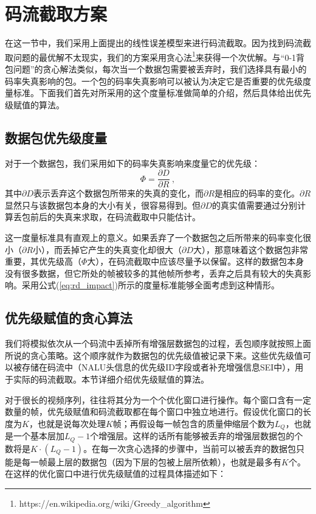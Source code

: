 \section{码流截取方案}
\label{extraction}

在这一节中，我们采用上面提出的线性误差模型来进行码流截取。因为找到码流截取问题的最优解不太现实，我们的方案采用贪心法\footnote{https://en.wikipedia.org/wiki/Greedy\_algorithm}来获得一个次优解。与“0-1背包问题”的贪心解法类似，每次当一个数据包需要被丢弃时，我们选择具有最小的码率失真影响的包。一个包的码率失真影响可以被认为决定它是否重要的优先级度量标准。下面我们首先对所采用的这个度量标准做简单的介绍，然后具体给出优先级赋值的算法。

\subsection{数据包优先级度量}

对于一个数据包，我们采用如下的码率失真影响来度量它的优先级：
\begin{equation}
\label{eq:rd_impact}
\Phi = \dfrac{\partial D}{\partial R} \: ,
\end{equation}
其中$\partial D$表示丢弃这个数据包所带来的失真的变化，而$\partial R$是相应的码率的变化。$\partial R$显然只与该数据包本身的大小有关，很容易得到。但$\partial D$的真实值需要通过分别计算丢包前后的失真来求取，在码流截取中只能估计。

这一度量标准具有直观上的意义。如果丢弃了一个数据包之后所带来的码率变化很小（$\partial R$小），而丢掉它产生的失真变化却很大（$\partial D$大），那意味着这个数据包非常重要，其优先级高（$\Phi$大），在码流截取中应该尽量予以保留。这样的数据包本身没有很多数据，但它所处的帧被较多的其他帧所参考，丢弃之后具有较大的失真影响。采用公式(\ref{eq:rd_impact})所示的度量标准能够全面考虑到这种情形。

\subsection{优先级赋值的贪心算法}
\label{subsec:priority-assign}

我们将模拟依次从一个码流中丢掉所有增强层数据包的过程，丢包顺序就按照上面所说的贪心策略。这个顺序就作为数据包的优先级值被记录下来。这些优先级值可以被存储在码流中（NALU头信息的优先级ID字段或者补充增强信息SEI中），用于实际的码流截取。本节详细介绍优先级赋值的算法。

对于很长的视频序列，往往将其分为一个个优化窗口进行操作。每个窗口含有一定数量的帧，优先级赋值和码流截取都在每个窗口中独立地进行。假设优化窗口的长度为$K$，也就是说每次处理$K$帧；再假设每一帧包含的质量伸缩层个数为$L_Q$，也就是一个基本层加$L_Q-1$个增强层。这样的话所有能够被丢弃的增强层数据包的个数将是$K \cdot (L_Q-1)$。在每一次贪心选择的步骤中，当前可以被丢弃的数据包只能是每一帧最上层的数据包（因为下层的包被上层所依赖），也就是最多有$K$个。在这样的优化窗口中进行优先级赋值的过程具体描述如下：

